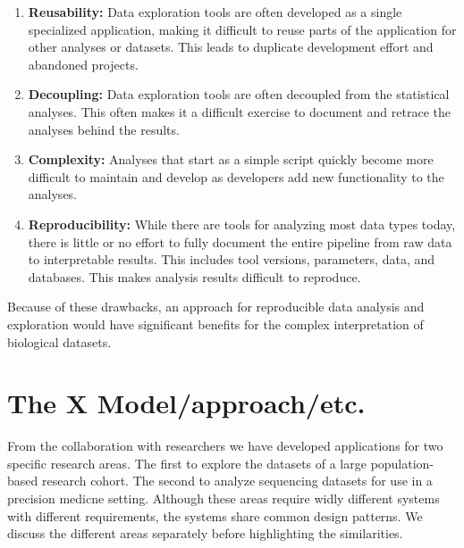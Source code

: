 \begin{enumerate}
    \item \textbf{Reusability:} Data exploration tools are often
        developed as a single specialized application, making it difficult to
        reuse parts of the application for other analyses or datasets. This
        leads to duplicate development effort and abandoned projects. 
    \item \textbf{Decoupling:} Data exploration tools are often decoupled from
        the statistical analyses. This often makes it a difficult 
        exercise to
        document and retrace the analyses behind the results. 
    \item \textbf{Complexity:} 
        Analyses that start as a simple script quickly become more 
        difficult to
        maintain and develop as developers add new functionality to the
        analyses. %
    \item \textbf{Reproducibility:} While there are tools for analyzing most
        data types today, there is little or no effort to fully document the
        entire 
        pipeline from raw data to interpretable results. This includes
        tool versions, parameters, data, and databases. This makes analysis
        results difficult to reproduce. 
\end{enumerate} 

Because of these drawbacks, an approach for reproducible data analysis and
exploration would have significant benefits for the 
complex interpretation
of biological datasets.

\section{The X Model/approach/etc.} 
From the collaboration with 
researchers we have developed applications for two
specific research areas. The first to explore the datasets of a large
population-based research cohort. The second to analyze sequencing datasets for
use in a precision medicne setting. Although these areas require widly different
systems with different requirements, the systems share common design patterns.
We discuss the different areas separately before highlighting the similarities. 

